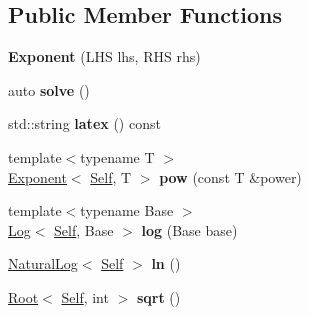 \subsection*{Public Member Functions}
\begin{DoxyCompactItemize}
\item 
\hypertarget{classlatex_1_1math_1_1Exponent_aa5aed1982f782807e28d89ee55e80b6c}{{\bfseries Exponent} (L\-H\-S lhs, R\-H\-S rhs)}\label{classlatex_1_1math_1_1Exponent_aa5aed1982f782807e28d89ee55e80b6c}

\item 
\hypertarget{classlatex_1_1math_1_1Exponent_a8439ad349c0eccc952ef103f08d2bfa9}{auto {\bfseries solve} ()}\label{classlatex_1_1math_1_1Exponent_a8439ad349c0eccc952ef103f08d2bfa9}

\item 
\hypertarget{classlatex_1_1math_1_1Exponent_a8574c4b6b5e978c26b3aec20a8ecddaa}{std\-::string {\bfseries latex} () const }\label{classlatex_1_1math_1_1Exponent_a8574c4b6b5e978c26b3aec20a8ecddaa}

\item 
\hypertarget{classlatex_1_1math_1_1Exponent_a3356a953247f72211236fc7348a96eee}{{\footnotesize template$<$typename T $>$ }\\\hyperlink{classlatex_1_1math_1_1Exponent}{Exponent}$<$ \hyperlink{classlatex_1_1math_1_1Exponent}{Self}, T $>$ {\bfseries pow} (const T \&power)}\label{classlatex_1_1math_1_1Exponent_a3356a953247f72211236fc7348a96eee}

\item 
\hypertarget{classlatex_1_1math_1_1Exponent_a9ab50d8d1eec6941094ad43be822ebc9}{{\footnotesize template$<$typename Base $>$ }\\\hyperlink{classlatex_1_1math_1_1Log}{Log}$<$ \hyperlink{classlatex_1_1math_1_1Exponent}{Self}, Base $>$ {\bfseries log} (Base base)}\label{classlatex_1_1math_1_1Exponent_a9ab50d8d1eec6941094ad43be822ebc9}

\item 
\hypertarget{classlatex_1_1math_1_1Exponent_afcc8f289108fa9e56aeb149698f3eeb3}{\hyperlink{classlatex_1_1math_1_1NaturalLog}{Natural\-Log}$<$ \hyperlink{classlatex_1_1math_1_1Exponent}{Self} $>$ {\bfseries ln} ()}\label{classlatex_1_1math_1_1Exponent_afcc8f289108fa9e56aeb149698f3eeb3}

\item 
\hypertarget{classlatex_1_1math_1_1Exponent_acd5ba5b5920f79e1b1a7332c3f248121}{\hyperlink{classlatex_1_1math_1_1Root}{Root}$<$ \hyperlink{classlatex_1_1math_1_1Exponent}{Self}, int $>$ {\bfseries sqrt} ()}\label{classlatex_1_1math_1_1Exponent_acd5ba5b5920f79e1b1a7332c3f248121}

\end{DoxyCompactItemize}
